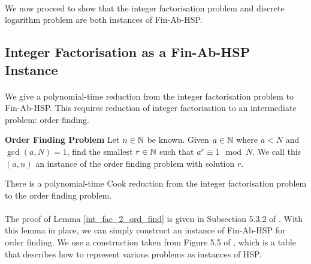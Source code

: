 \paragraph{}
We now proceed to show that the integer factorisation problem and discrete logarithm problem are both instances of Fin-Ab-HSP.

\subsection{Integer Factorisation as a Fin-Ab-HSP Instance}
\paragraph{}
We give a polynomial-time reduction from the integer factorisation problem to Fin-Ab-HSP. This requires reduction of integer factorisation to an intermediate problem: order finding.

\theoremstyle{definition}
\begin{definition}{\textbf{Order Finding Problem}}
Let $n \in \mathbb{N}$ be known. Given $a \in \mathbb{N}$ where $a < N$ and $\gcd(a, N) = 1$, find the smallest $r \in \mathbb{N}$ such that $a^r \equiv 1 \mod{N}$. We call this $(a, n)$ an instance of the order finding problem with solution $r$.
\end{definition}

\begin{lemma}\label{int_fac_2_ord_find}
There is a polynomial-time Cook reduction from the integer factorisation problem to the order finding problem.
\end{lemma}

\paragraph{}
The proof of Lemma \ref{int_fac_2_ord_find} is given in Subsection 5.3.2 of \cite{nielsen2002quantum}. With this lemma in place, we can simply construct an instance of Fin-Ab-HSP for order finding. We use a construction taken from Figure 5.5 of \cite{nielsen2002quantum}, which is a table that describes how to represent various problems as instances of HSP.

